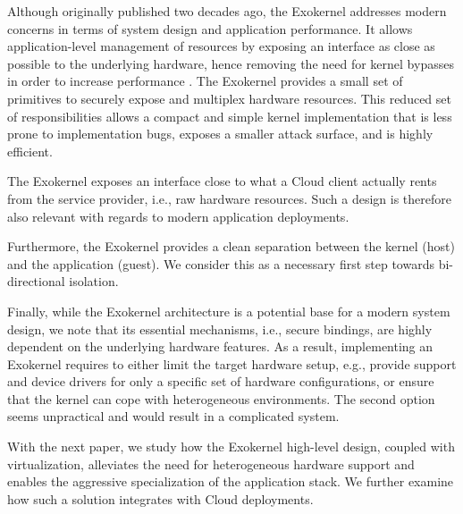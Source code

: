 Although originally published two decades ago, the Exokernel addresses modern concerns in terms of system design and application performance.
It allows application-level management of resources by exposing an interface as close as possible to the underlying hardware, hence removing the need for kernel bypasses in order to increase performance \cite{BelayPKGKB14,DBLP:journals/tocs/CaoFKL96}.
The Exokernel provides a small set of primitives to securely expose and multiplex hardware resources.
This reduced set of responsibilities allows a compact and simple kernel implementation that is less prone to implementation bugs, exposes a smaller attack surface, and is highly efficient.

The Exokernel exposes an interface close to what a Cloud client actually rents from the service provider, i.e., raw hardware resources.
Such a design is therefore also relevant with regards to modern application deployments. 

Furthermore, the Exokernel provides a clean separation between the kernel (host) and the application (guest).
We consider this as a necessary first step towards bi-directional isolation.

Finally, while the Exokernel architecture is a potential base for a modern system design, we note that its essential mechanisms, i.e., secure bindings, are highly dependent on the underlying hardware features.
As a result, implementing an Exokernel requires to either limit the target hardware setup, e.g., provide support and device drivers for only a specific set of hardware configurations, or ensure that the kernel can cope with heterogeneous environments.
The second option seems unpractical and would result in a complicated system.

With the next paper, we study how the Exokernel high-level design, coupled with virtualization, alleviates the need for heterogeneous hardware support and enables the aggressive specialization of the application stack.
We further examine how such a solution integrates with Cloud deployments.



